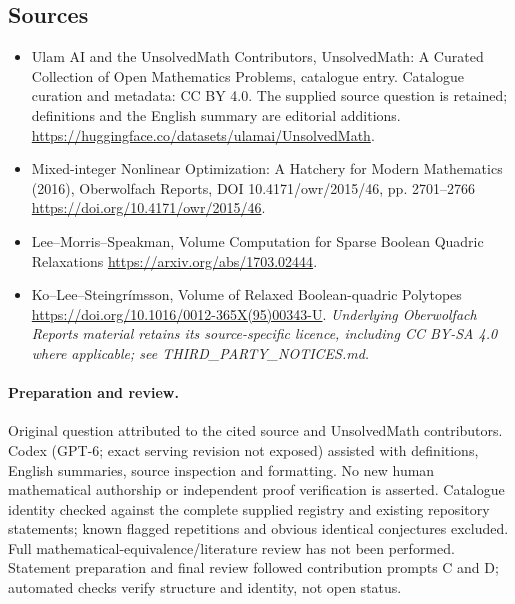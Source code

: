 \documentclass[11pt]{article}
\begin{document}
\subsection{Sources}
\begin{itemize}
\item[\hypertarget{source:statement:1}{S1}] Ulam AI and the UnsolvedMath Contributors, UnsolvedMath: A Curated Collection of Open Mathematics Problems, catalogue entry. Catalogue curation and metadata: CC BY 4.0. The supplied source question is retained; definitions and the English summary are editorial additions.
\url{https://huggingface.co/datasets/ulamai/UnsolvedMath}.
\item[\hypertarget{source:statement:2}{S2}] Mixed-integer Nonlinear Optimization: A Hatchery for Modern Mathematics (2016), Oberwolfach Reports, DOI 10.4171/owr/2015/46, pp. 2701--2766
\url{https://doi.org/10.4171/owr/2015/46}.
\item[\hypertarget{source:statement:3}{S3}] Lee--Morris--Speakman, Volume Computation for Sparse Boolean Quadric Relaxations
\url{https://arxiv.org/abs/1703.02444}.
\item[\hypertarget{source:statement:4}{S4}] Ko--Lee--Steingrímsson, Volume of Relaxed Boolean-quadric Polytopes
\url{https://doi.org/10.1016/0012-365X(95)00343-U}.
\textit{Underlying Oberwolfach Reports material retains its source-specific licence, including CC BY-SA 4.0 where applicable; see THIRD\_PARTY\_NOTICES.md.}
\end{itemize}
\paragraph{Preparation and review.}
Original question attributed to the cited source and UnsolvedMath contributors. Codex (GPT-6; exact serving revision not exposed) assisted with definitions, English summaries, source inspection and formatting. No new human mathematical authorship or independent proof verification is asserted. Catalogue identity checked against the complete supplied registry and existing repository statements; known flagged repetitions and obvious identical conjectures excluded. Full mathematical-equivalence/literature review has not been performed. Statement preparation and final review followed contribution prompts C and D; automated checks verify structure and identity, not open status.
\label{end:statement}
\end{document}
